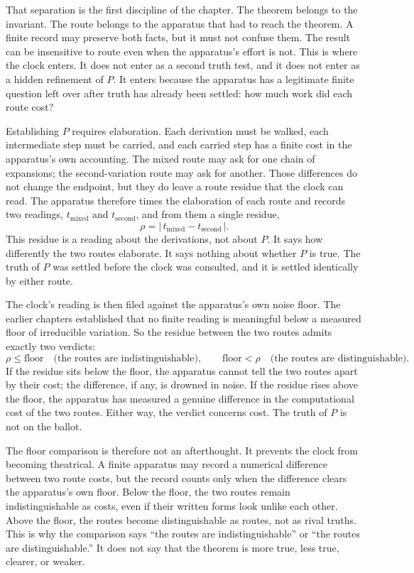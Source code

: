 That separation is the first discipline of the chapter. The theorem belongs to
the invariant. The route belongs to the apparatus that had to reach the
theorem. A finite record may preserve both facts, but it must not confuse them.
The result can be insensitive to route even when the apparatus's effort is not.
This is where the clock enters. It does not enter as a second truth test, and it
does not enter as a hidden refinement of \(P\). It enters because the apparatus
has a legitimate finite question left over after truth has already been settled:
how much work did each route cost?

Establishing \(P\) requires elaboration. Each derivation must be walked, each
intermediate step must be carried, and each carried step has a finite cost in
the apparatus's own accounting. The mixed route may ask for one chain of
expansions; the second-variation route may ask for another. Those differences
do not change the endpoint, but they do leave a route residue that the clock can
read. The apparatus therefore times the elaboration of each route and records
two readings, \(t_{\text{mixed}}\) and \(t_{\text{second}}\), and from them a
single residue,
\[
  \rho = \lvert\, t_{\text{mixed}} - t_{\text{second}} \,\rvert.
\]
This residue is a reading about the derivations, not about \(P\). It says how
differently the two routes elaborate. It says nothing about whether \(P\) is
true. The truth of \(P\) was settled before the clock was consulted, and it is
settled identically by either route.

The clock's reading is then filed against the apparatus's own noise floor. The
earlier chapters established that no finite reading is meaningful below a measured
floor of irreducible variation. So the residue between the two routes admits
exactly two verdicts:
\[
  \rho \le \text{floor}
  \quad\text{(the routes are indistinguishable)},
  \qquad
  \text{floor} < \rho
  \quad\text{(the routes are distinguishable)}.
\]
If the residue sits below the floor, the apparatus cannot tell the two routes
apart by their cost; the difference, if any, is drowned in noise. If the residue
rises above the floor, the apparatus has measured a genuine difference in the
computational cost of the two routes. Either way, the verdict concerns cost. The
truth of \(P\) is not on the ballot.

The floor comparison is therefore not an afterthought. It prevents the clock
from becoming theatrical. A finite apparatus may record a numerical difference
between two route costs, but the record counts only when the difference clears
the apparatus's own floor. Below the floor, the two routes remain
indistinguishable as costs, even if their written forms look unlike each other.
Above the floor, the routes become distinguishable as routes, not as rival
truths. This is why the comparison says ``the routes are indistinguishable'' or
``the routes are distinguishable.'' It does not say that the theorem is more
true, less true, clearer, or weaker.

